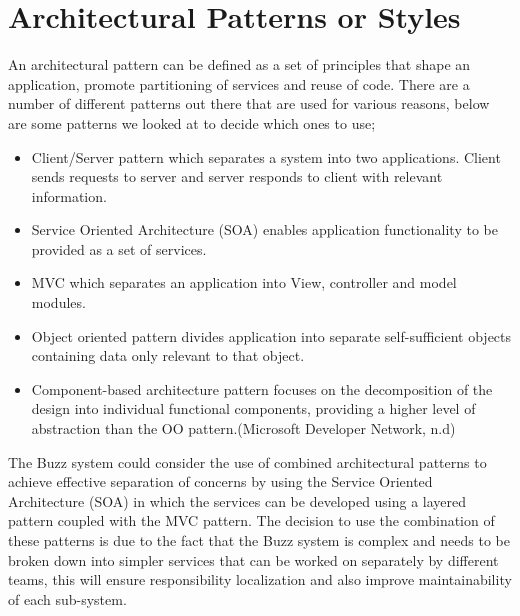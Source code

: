 \documentclass[a4paper]{article}
\begin{document}
\section{Architectural Patterns or Styles}
An architectural pattern can be defined as a set of principles that shape an application, promote partitioning of services and reuse of code. There are a number of different patterns out there that are used for various reasons, below are some patterns we looked at to decide which ones to use;
\begin{itemize}
			\item Client/Server pattern which separates a system into two applications. Client sends requests to server and server responds to client with relevant information.
			\item Service Oriented Architecture (SOA) enables application functionality to be provided as a set of services.
			\item MVC which separates an application into View, controller and model modules.
			\item Object oriented pattern divides application into separate self-sufficient objects containing data only relevant to that object.
			\item Component-based architecture pattern focuses on the decomposition of the design into individual functional components, providing a higher level of abstraction than the OO pattern.(Microsoft Developer Network, n.d) \\[1em]
\end{itemize}
The Buzz system could consider the use of combined architectural patterns to achieve effective separation of concerns by using the Service Oriented Architecture (SOA) in which the services can be developed using a layered pattern coupled with the MVC pattern. 
The decision to use the combination of these patterns is due to the fact that the Buzz system is complex and needs to be broken down into simpler services that can be worked on separately by different teams, this will ensure responsibility localization and also improve maintainability of each sub-system. 
\end{document}
